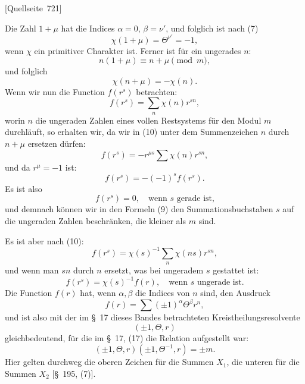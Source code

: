 \documentclass[11pt]{article}
\newcommand{\srcpage}[1]{\par\medskip\noindent\textsf{[Quellseite~#1]}\par\smallskip}
\begin{document}
\srcpage{721}
Die Zahl $1+\mu$ hat die Indices $\alpha=0$, $\beta=\nu'$, und folglich ist nach (7)
\[
\chi(1+\mu)=\Theta^{\nu'}=-1,
\]
wenn $\chi$ ein primitiver Charakter ist. Ferner ist für ein ungerades $n$:
\[
n(1+\mu)\equiv n+\mu\pmod m,
\]
und folglich
\[
\chi(n+\mu)=-\chi(n).
\]
Wenn wir nun die Function $f(r^s)$ betrachten:
\begin{equation}
f(r^s)=\sum_n\chi(n)r^{sn},
\tag{10}
\end{equation}
worin $n$ die ungeraden Zahlen eines vollen Restsystems für den Modul $m$ durchläuft, so erhalten wir, da wir in (10) unter dem Summenzeichen $n$ durch $n+\mu$ ersetzen dürfen:
\[
f(r^s)=-r^{\mu s}\sum\chi(n)r^{sn},
\]
und da $r^\mu=-1$ ist:
\[
f(r^s)=-(-1)^sf(r^s).
\]
Es ist also
\begin{equation}
f(r^s)=0,\quad \text{wenn }s\text{ gerade ist,}
\tag{11}
\end{equation}
und demnach können wir in den Formeln (9) den Summationsbuchstaben $s$ auf die ungeraden Zahlen beschränken, die kleiner als $m$ sind.

Es ist aber nach (10):
\[
f(r^s)=\chi(s)^{-1}\sum_n\chi(ns)r^{sn},
\]
und wenn man $sn$ durch $n$ ersetzt, was bei ungeradem $s$ gestattet ist:
\begin{equation}
f(r^s)=\chi(s)^{-1}f(r),\quad \text{wenn }s\text{ ungerade ist.}
\tag{12}
\end{equation}
Die Function $f(r)$ hat, wenn $\alpha,\beta$ die Indices von $n$ sind, den Ausdruck
\begin{equation}
f(r)=\sum(\pm1)^\alpha\Theta^\beta r^n,
\tag{13}
\end{equation}
und ist also mit der im \S~17 dieses Bandes betrachteten Kreistheilungsresolvente
\[
(\pm1,\Theta,r)
\]
gleichbedeutend, für die im \S~17, (17) die Relation aufgestellt war:
\begin{equation}
(\pm1,\Theta,r)(\pm1,\Theta^{-1},r)=\pm m.
\tag{14}
\end{equation}
Hier gelten durchweg die oberen Zeichen für die Summen $X_1$, die unteren für die Summen $X_2$ [\S~195, (7)].
\end{document}
